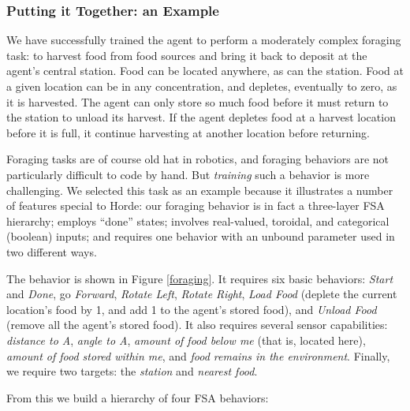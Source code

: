 \documentclass[11pt]{article}
\begin{document}
\subsubsection*{Putting it Together: an Example}  We have successfully trained the agent to perform a moderately complex foraging task: to harvest food from food sources and bring it back to deposit at the agent's central station.  Food can be located anywhere, as can the station. Food at a given location can be in any concentration, and depletes, eventually to zero, as it is harvested.  The agent can only store so much food before it must return to the station to unload its harvest.  If the agent depletes food at a harvest location before it is full, it continue harvesting at another location before returning.

Foraging tasks are of course old hat in robotics, and foraging behaviors are not particularly difficult to code by hand.  But {\it training} such a behavior is more challenging.  We selected this task as an example because it illustrates a number of features special to Horde: our foraging behavior is in fact a three-layer FSA hierarchy; employs ``done'' states; involves real-valued, toroidal, and categorical (boolean) inputs; and requires one behavior with an unbound parameter used in two different ways.

The behavior is shown in Figure \ref{foraging}.  It requires six basic behaviors: {\it Start} and {\it Done}, go {\it Forward}, {\it Rotate Left}, {\it Rotate Right}, {\it Load Food} (deplete the current location's food by 1, and add 1 to the agent's stored food), and {\it Unload Food} (remove all the agent's stored food).  It also requires several sensor capabilities: {\it distance to A}, {\it angle to A}, {\it amount of food below me} (that is, located here), {\it amount of food stored within me}, and {\it food remains in the environment}.  Finally, we require two targets: the {\it station} and {\it nearest food}.

From this we build a hierarchy of four FSA behaviors:
\end{document}
